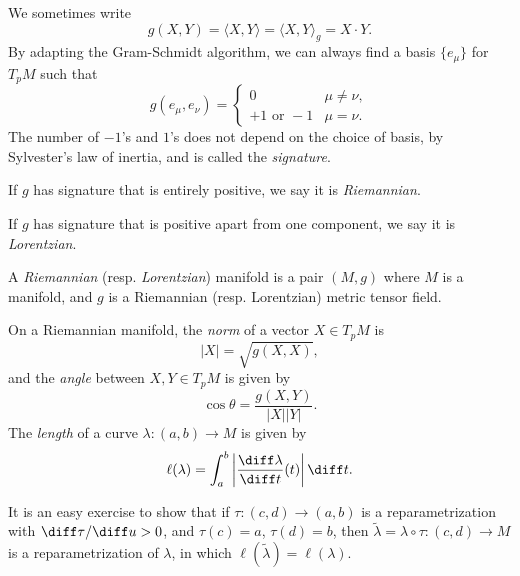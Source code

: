 \documentclass[12pt]{article}
\begin{document}
We sometimes write
\[
g(X, Y) = \langle X, Y\rangle = \langle X, Y\rangle_g = X \cdot Y.
\]
By adapting the Gram-Schmidt algorithm, we can always find a basis $\{e_\mu\}$ for $T_p M$ such that
\[
g(e_\mu, e_\nu) =
\begin{cases}
	0 & \mu \neq \nu, \\
	+1 \text{ or } -1 & \mu = \nu.
\end{cases}
\]
The number of $-1$'s and $1$'s does not depend on the choice of basis, by Sylvester's law of inertia, and is called the \emph{signature}.

If $g$ has signature that is entirely positive, we say it is \emph{Riemannian}.

If $g$ has signature that is positive apart from one component, we say it is \emph{Lorentzian}.

\begin{definition}
	A \emph{Riemannian} (resp. \emph{Lorentzian}) manifold is a pair $(M, g)$ where $M$ is a manifold, and $g$ is a Riemannian (resp. Lorentzian) metric tensor field.

	On a Riemannian manifold, the \emph{norm} of a vector $X \in T_p M$ is
	\[
		|X| = \sqrt{g(X, X)},
	\]
	and the \emph{angle} between $X, Y \in T_p M$ is given by
	\[
	\cos \theta = \frac{g(X, Y)}{|X||Y|}.
	\]
	The \emph{length} of a curve $\lambda : (a, b) \to M$ is given by
	\[
	\ell(\lambda) = \int_a^b \left| \frac{\diff \lambda}{\diff t} (t) \right| \diff t.
	\]
\end{definition}

It is an easy exercise to show that if $\tau : (c, d) \to (a, b)$ is a reparametrization with $\diff \tau/ \diff u > 0$, and $\tau(c) = a$, $\tau(d) = b$, then $\tilde \lambda = \lambda \circ \tau : (c, d) \to M$ is a reparametrization of $\lambda$, in which $\ell(\tilde \lambda) = \ell(\lambda)$.

\end{document}
